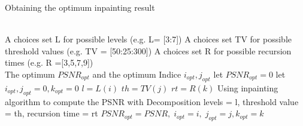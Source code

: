 \begin{algorithm} 
\caption{Obtaining the optimum inpainting result}  
\label{alg:5}  
\begin{algorithmic}
\REQUIRE ~~\\ %
A choices set L for possible levels (e.g. L= [3:7])
A choices set TV for possible threshold values (e.g. TV = [50:25:300])
A choices set R for possible recursion times (e.g. R =[3,5,7,9])
\ENSURE ~~\\ %
The {opt}imum $PSNR_{opt}$ and the {opt}imum Indice $i_{opt},j_{opt}$
\STATE let $PSNR_{opt} = 0$
\STATE let $i_{opt} , j_{opt} =0, k_{opt} =0$
\STATE $l = L(i)$
\STATE $th = TV(j)$
\STATE $rt = R(k)$
\STATE Using inpainting algorithm to compute the PSNR with Decomposition levels = l, threshold value = th, recursion time = rt
\STATE $PSNR_{opt} = PSNR, \; i_{opt} = i,\; j_{opt} = j, k_{opt} = k$ 
\ENDIF
\ENDFOR
\ENDFOR
\ENDFOR

\end{algorithmic}  
\end{algorithm}  

